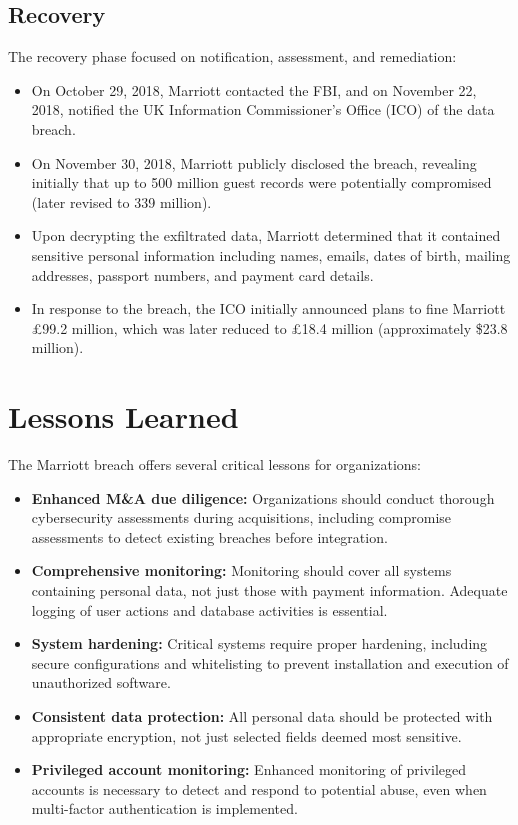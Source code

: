\documentclass[11pt]{book}
\begin{document}
\subsection{Recovery}
The recovery phase focused on notification, assessment, and remediation:
\begin{itemize}
    \item On October 29, 2018, Marriott contacted the FBI, and on November 22, 2018, notified the UK Information Commissioner's Office (ICO) of the data breach.
    \item On November 30, 2018, Marriott publicly disclosed the breach, revealing initially that up to 500 million guest records were potentially compromised (later revised to 339 million).
    \item Upon decrypting the exfiltrated data, Marriott determined that it contained sensitive personal information including names, emails, dates of birth, mailing addresses, passport numbers, and payment card details.
    \item In response to the breach, the ICO initially announced plans to fine Marriott £99.2 million, which was later reduced to £18.4 million (approximately \$23.8 million).
\end{itemize}

\section{Lessons Learned}
The Marriott breach offers several critical lessons for organizations:
\begin{itemize}
    \item \textbf{Enhanced M\&A due diligence:} Organizations should conduct thorough cybersecurity assessments during acquisitions, including compromise assessments to detect existing breaches before integration.
    \item \textbf{Comprehensive monitoring:} Monitoring should cover all systems containing personal data, not just those with payment information. Adequate logging of user actions and database activities is essential.
    \item \textbf{System hardening:} Critical systems require proper hardening, including secure configurations and whitelisting to prevent installation and execution of unauthorized software.
    \item \textbf{Consistent data protection:} All personal data should be protected with appropriate encryption, not just selected fields deemed most sensitive.
    \item \textbf{Privileged account monitoring:} Enhanced monitoring of privileged accounts is necessary to detect and respond to potential abuse, even when multi-factor authentication is implemented.
\end{itemize}
\end{document}
